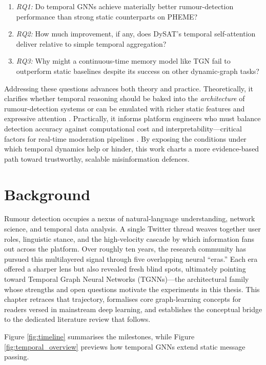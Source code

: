 \documentclass{cshonours}
\begin{document}
\begin{enumerate}
    \item \emph{RQ1:} Do temporal GNNs achieve materially better rumour-detection performance than strong static counterparts on PHEME?  
    \item \emph{RQ2:} How much improvement, if any, does DySAT’s temporal self-attention deliver relative to simple temporal aggregation?  
    \item \emph{RQ3:} Why might a continuous-time memory model like TGN fail to outperform static baselines despite its success on other dynamic-graph tasks?  
\end{enumerate}


Addressing these questions advances both theory and practice.  Theoretically, it clarifies whether temporal reasoning should be baked into the \emph{architecture} of rumour-detection systems or can be emulated with richer static features and expressive attention \cite{choi2021dynGCN}.  Practically, it informs platform engineers who must balance detection accuracy against computational cost and interpretability—critical factors for real-time moderation pipelines \cite{survey2024disinfo}.  By exposing the conditions under which temporal dynamics help or hinder, this work charts a more evidence-based path toward trustworthy, scalable misinformation defences.


\chapter{Background}\label{chap:background}

Rumour detection occupies a nexus of natural-language understanding, network science, and temporal data analysis.  A single Twitter thread weaves together user roles, linguistic stance, and the high-velocity cascade by which information fans out across the platform.  Over roughly ten years, the research community has pursued this multilayered signal through five overlapping neural “eras.”  Each era offered a sharper lens but also revealed fresh blind spots, ultimately pointing toward Temporal Graph Neural Networks (TGNNs)—the architectural family whose strengths and open questions motivate the experiments in this thesis.  This chapter retraces that trajectory, formalises core graph-learning concepts for readers versed in mainstream deep learning, and establishes the conceptual bridge to the dedicated literature review that follows.  

Figure \ref{fig:timeline} summarises the milestones, while Figure \ref{fig:temporal_overview} previews how temporal GNNs extend static message passing.
\end{document}
